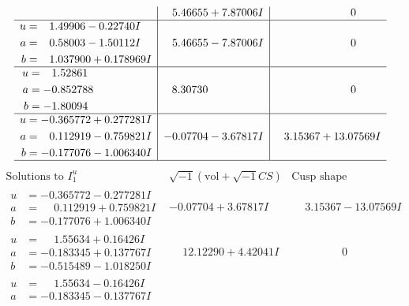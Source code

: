 \documentclass[1p]{elsarticle_modified}
\theoremstyle{definition}
\newcommand{\I}{\sqrt{-1}}
\begin{document}
$$\begin{array}{c|c|c}
 & \phantom{-}5.46655 + 7.87006 I & \phantom{-0.000000 } 0 \\ \hline\begin{aligned}
u &= \phantom{-}1.49906 - 0.22740 I \\
a &= \phantom{-}0.58003 - 1.50112 I \\
b &= \phantom{-}1.037900 + 0.178969 I\end{aligned}
 & \phantom{-}5.46655 - 7.87006 I & \phantom{-0.000000 } 0 \\ \hline\begin{aligned}
u &= \phantom{-}1.52861\phantom{ +0.000000I} \\
a &= -0.852788\phantom{ +0.000000I} \\
b &= -1.80094\phantom{ +0.000000I}\end{aligned}
 & \phantom{-}8.30730\phantom{ +0.000000I} & \phantom{-0.000000 } 0 \\ \hline\begin{aligned}
u &= -0.365772 + 0.277281 I \\
a &= \phantom{-}0.112919 - 0.759821 I \\
b &= -0.177076 - 1.006340 I\end{aligned}
 & -0.07704 - 3.67817 I & \phantom{-}3.15367 + 13.07569 I\\
 \hline 
 \end{array}$$\newpage$$\begin{array}{c|c|c}  
\text{Solutions to }I^u_{1}& \I (\text{vol} + \sqrt{-1}CS) & \text{Cusp shape}\\
 \hline 
\begin{aligned}
u &= -0.365772 - 0.277281 I \\
a &= \phantom{-}0.112919 + 0.759821 I \\
b &= -0.177076 + 1.006340 I\end{aligned}
 & -0.07704 + 3.67817 I & \phantom{-}3.15367 - 13.07569 I \\ \hline\begin{aligned}
u &= \phantom{-}1.55634 + 0.16426 I \\
a &= -0.183345 + 0.137767 I \\
b &= -0.515489 - 1.018250 I\end{aligned}
 & \phantom{-}12.12290 + 4.42041 I & \phantom{-0.000000 } 0 \\ \hline\begin{aligned}
u &= \phantom{-}1.55634 - 0.16426 I \\
a &= -0.183345 - 0.137767 I \\

\end{aligned}
\end{array}$$
\end{document}
